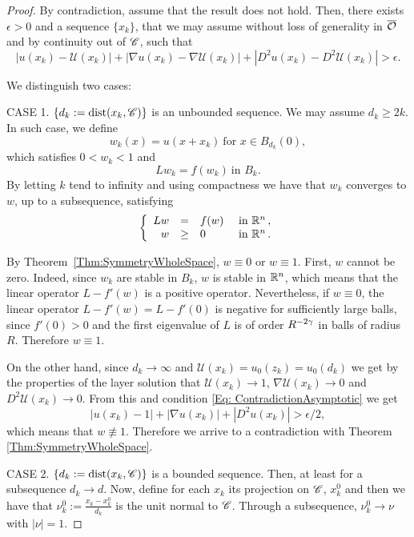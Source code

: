 \begin{proof}
By contradiction, assume that the result does not hold. Then, there exists $\epsilon>0$ and a sequence $\{x_k\}$, that we may assume without loss of generality in $\overline{\mathcal{O}}$ and by continuity out of ${\mathscr{C}}$, such that
\begin{equation}
\label{Eq:ContradictionAsymptotic}
|u(x_k)-\mathcal{U}(x_k)|+|\nabla u(x_k)-\nabla \mathcal{U}(x_k)|+|D^2u(x_k)-D^2\mathcal{U}(x_k)| > \epsilon.
\end{equation}


We distinguish two cases:

CASE 1. $\{d_k:=\operatorname{dist}(x_k,\mathscr{C})\}$ is an unbounded sequence. We may assume $d_k \geq 2k$.\\
In such case, we define
$$
w_k(x) = u(x+x_k)  \ \textrm{for } x\in B_{d_k}(0), 
$$
which satisfies $0<w_k<1$ and
$$
Lw_k = f(w_k) \ \textrm{in } B_k.
$$
By letting $k$ tend to infinity and using compactness  we have that $w_k$ converges to $w$, up to a subsequence, satisfying
$$
\left\{\begin{array}{rcll}
L w &=& f(w) & \textrm{ in }\mathbb{R}^n\,,\\
w &\geq& 0 & \textrm{ in } \mathbb{R}^n\,.
\end{array} \right.
$$

By Theorem~\ref{Thm:SymmetryWholeSpace}, $w\equiv 0$ or $w\equiv 1$. First, $w$ cannot be zero. Indeed, since $w_k$ are stable in $B_k$, $w$ is stable in $\mathbb{R}^n$, which means that the linear operator $L-f'(w)$ is a positive operator. Nevertheless, if $w\equiv 0$, the linear operator $L-f'(w) = L-f'(0)$ is negative for sufficiently large balls, since $f'(0)>0$ and the first eigenvalue of $L$ is of order $R^{-2\gamma}$ in balls of radius $R$. Therefore $w\equiv 1$. 

On the other hand, since $d_k\rightarrow \infty$  and $\mathcal{U}(x_k) = u_0(z_k) = u_0(d_k)$ we get by the properties of the layer solution  that $\mathcal{U}(x_k) \rightarrow 1$, $\nabla \mathcal{U}(x_k) \rightarrow 0$ and $D^2\mathcal{U}(x_k) \rightarrow 0$. From this and condition \eqref{Eq: ContradictionAsymptotic} we get
$$
|u(x_k)-1|+|\nabla u(x_k)|+|D^2u(x_k)| > \epsilon/2,
$$
which means that $w \not\equiv 1$. Therefore we arrive to a contradiction with Theorem \ref{Thm:SymmetryWholeSpace}.

CASE 2. $\{d_k:=\operatorname{dist}(x_k,\mathscr{C})\}$ is a bounded sequence.
Then, at least for a subsequence $d_k \rightarrow d$. Now, define for each $x_k$ its projection on $\mathscr{C}$, $x_k^0$ and then we have that $ \nu_k^0 := \frac{x_k-x_k^0}{d_k}$ is the unit normal to $\mathscr{C}$. Through a subsequence, $ \nu_k^0 \rightarrow \nu$ with $|\nu|=1$.


\end{proof}
